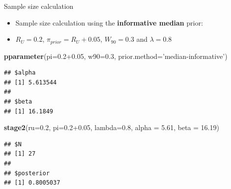 \documentclass{beamer}
\newenvironment{Shaded}{}{}
\newcommand{\KeywordTok}[1]{\textcolor[rgb]{0.00,0.44,0.13}{\textbf{{#1}}}}
\newcommand{\DataTypeTok}[1]{\textcolor[rgb]{0.56,0.13,0.00}{{#1}}}
\newcommand{\FloatTok}[1]{\textcolor[rgb]{0.25,0.63,0.44}{{#1}}}
\newcommand{\StringTok}[1]{\textcolor[rgb]{0.25,0.44,0.63}{{#1}}}
\newcommand{\NormalTok}[1]{{#1}}
\begin{document}
\begin{frame}[fragile]{Sample size calculation}

\begin{itemize}
\item
  Sample size calculation using the \textbf{informative median} prior:
\item
  \(R_U=0.2\), \(\pi_{prior}=R_U+0.05\), \(W_{90}=0.3\) and
  \(\lambda=0.8\)
\end{itemize}

\begin{Shaded}
\begin{Highlighting}[]
\KeywordTok{pparameter}\NormalTok{(}\DataTypeTok{pi=}\FloatTok{0.2+0.05}\NormalTok{, }\DataTypeTok{w90=}\FloatTok{0.3}\NormalTok{, }\DataTypeTok{prior.method=}\StringTok{'median-informative'}\NormalTok{)}
\end{Highlighting}
\end{Shaded}

\begin{verbatim}
## $alpha
## [1] 5.613544
## 
## $beta
## [1] 16.1849
\end{verbatim}

\begin{Shaded}
\begin{Highlighting}[]
\KeywordTok{stage2}\NormalTok{(}\DataTypeTok{ru=}\FloatTok{0.2}\NormalTok{, }\DataTypeTok{pi=}\FloatTok{0.2+0.05}\NormalTok{, }\DataTypeTok{lambda=}\FloatTok{0.8}\NormalTok{, }\DataTypeTok{alpha =} \FloatTok{5.61}\NormalTok{, }\DataTypeTok{beta =} \FloatTok{16.19}\NormalTok{)}
\end{Highlighting}
\end{Shaded}

\begin{verbatim}
## $N
## [1] 27
## 
## $posterior
## [1] 0.8005037
\end{verbatim}

\end{frame}
\end{document}
